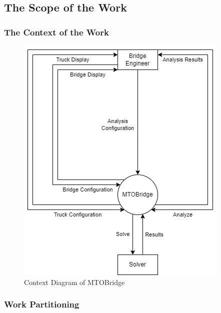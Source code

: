 \documentclass[12pt]{article}
\begin{document}
\subsection{The Scope of the Work}

\subsubsection{The Context of the Work}

\begin{figure}[H]
  \includegraphics[]{context-diagram.png}
  \caption{Context Diagram of MTOBridge}
  \label {fig:context-diagram}
\end{figure}

\subsubsection{Work Partitioning}
\end{document}
